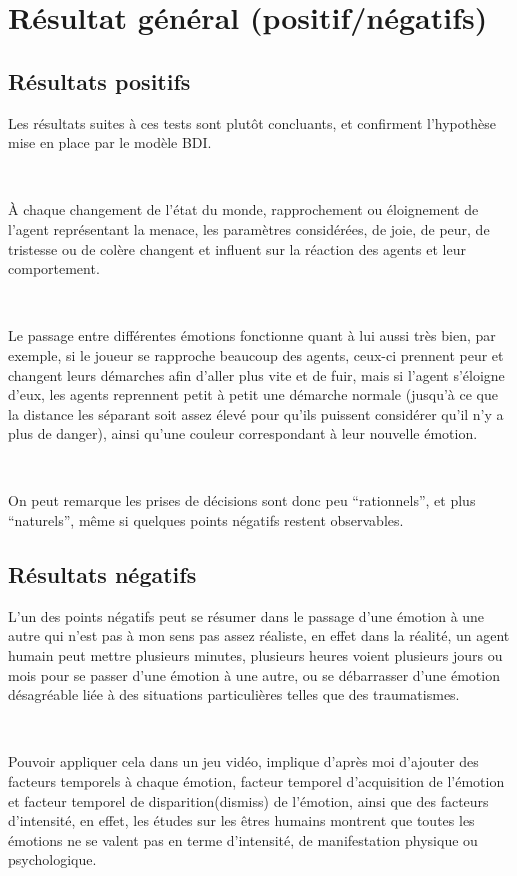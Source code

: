 \section{Résultat général (positif/négatifs)}

\subsection{Résultats positifs}

Les résultats suites à ces tests sont plutôt concluants, et confirment l’hypothèse mise en place par le modèle BDI.


~\par
À chaque changement de l’état du monde, rapprochement ou éloignement de l’agent représentant la menace, les paramètres considérées, de joie, de peur, de tristesse ou de colère changent et influent sur la réaction des agents et leur comportement.


~\par
Le passage entre différentes émotions fonctionne quant à lui aussi très bien, par exemple, si le joueur se rapproche beaucoup des agents, ceux-ci prennent peur et changent leurs démarches afin d’aller plus vite et de fuir, mais si l’agent s’éloigne d’eux, les agents reprennent petit à petit une démarche normale (jusqu’à ce que la distance les séparant soit assez élevé pour qu’ils puissent considérer qu’il n’y a plus de danger), ainsi qu’une couleur correspondant à leur nouvelle émotion.


~\par
On peut remarque les prises de décisions sont donc peu “rationnels”, et plus “naturels”, même si quelques points négatifs restent observables.

\subsection{Résultats négatifs}

L’un des points négatifs peut se résumer dans le passage d’une émotion à une autre qui n’est pas à mon sens pas assez réaliste, en effet dans la réalité, un agent humain peut mettre plusieurs minutes, plusieurs heures voient plusieurs jours ou mois pour se passer d’une émotion à une autre, ou se débarrasser d’une émotion désagréable liée à des situations particulières telles que des traumatismes.

~\par
Pouvoir appliquer cela dans un jeu vidéo, implique d'après moi d’ajouter des facteurs temporels à chaque émotion, facteur temporel d'acquisition de l’émotion et facteur temporel de disparition(dismiss) de l’émotion, ainsi que des facteurs d’intensité, en effet, les études sur les êtres humains montrent que toutes les émotions ne se valent pas en terme d’intensité, de manifestation physique ou psychologique.








